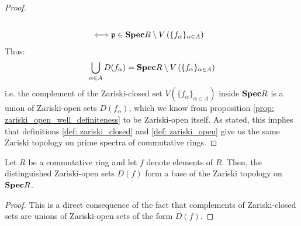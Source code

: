 \begin{proof}
$$\begin{aligned}
                                    \\
                                    \iff & \mathfrak{p} \in \mathbf{Spec} R \setminus V\left(\{f_{\alpha}\}_{\alpha \in A}\right)
                                \end{aligned}
                            $$
                        Thus:
                            $$\bigcup_{\alpha \in A} D(f_{\alpha}) = \mathbf{Spec} R \setminus V\left(\{f_{\alpha}\}_{\alpha \in A}\right)$$
                        i.e. the complement of the Zariski-closed set $V\left(\{f_{\alpha}\}_{\alpha \in A}\right)$ inside $\mathbf{Spec} R$ is a union of Zariski-open sets $D(f_{\alpha})$, which we know from proposition \ref{prop: zariski_open_well_definiteness} to be Zariski-open itself. As stated, this implies that definitions \ref{def: zariski_closed} and \ref{def: zariski_open} give us the same Zariski topology on prime spectra of commutative rings.
                    \end{proof}
                \begin{corollary} \label{coro: zariski_basis}
                    Let $R$ be a commutative ring and let $f$ denote elements of $R$. Then, the distinguished Zariski-open sets $D(f)$ form a base of the Zariski topology on $\mathbf{Spec} R$.
                \end{corollary}
                    \begin{proof}
                        This is a direct consequence of the fact that complements of Zariski-closed sets are unions of Zariski-open sets of the form $D(f)$.
                    \end{proof}
                

